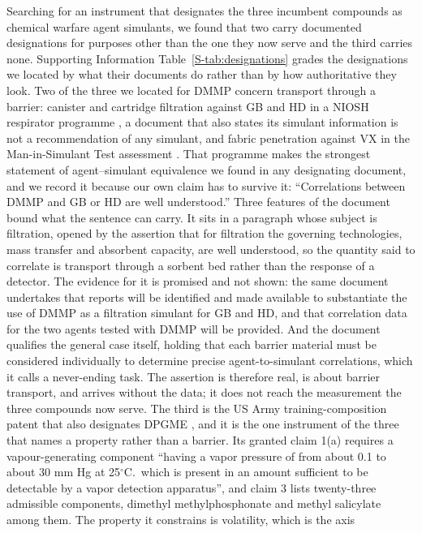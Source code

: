 \documentclass[journal=ancham,manuscript=article,margin=1in]{achemso}
\begin{document}
Searching for an instrument that designates the three incumbent compounds as
chemical warfare agent simulants, we found that two carry documented
designations for purposes other than the one they now serve and the third
carries none. Supporting Information Table~\ref{S-tab:designations} grades the
designations we located by what their documents do rather than by how
authoritative they look. Two of the three
we located for DMMP concern transport through a barrier: canister and cartridge
filtration against GB and HD in a NIOSH respirator programme
\cite{niosh2002simulant}, a document that also states its simulant information
is not a recommendation of any simulant, and fabric penetration against VX in
the Man-in-Simulant Test assessment \cite{nrc1997mist}. That programme makes
the strongest statement of agent--simulant equivalence we found in any
designating document, and we record it because our own claim has to survive it:
``Correlations between DMMP and GB or HD are well understood.'' Three features
of the document bound what the sentence can carry. It sits in a paragraph whose
subject is filtration, opened by the assertion that for filtration the governing
technologies, mass transfer and absorbent capacity, are well understood, so the
quantity said to correlate is transport through a sorbent bed rather than the
response of a detector. The evidence for it is promised and not shown: the same
document undertakes that reports will be identified and made available to
substantiate the use of DMMP as a filtration simulant for GB and HD, and that
correlation data for the two agents tested with DMMP will be provided. And the
document qualifies the general case itself, holding that each barrier material
must be considered individually to determine precise agent-to-simulant
correlations, which it calls a never-ending task. The assertion is therefore
real, is about barrier transport, and arrives without the data; it does not
reach the measurement the three compounds now serve. The third is the US
Army training-composition patent that also designates DPGME
\cite{seitzinger2006simulant}, and it is the one instrument of the three that
names a property rather than a barrier. Its granted claim 1(a) requires a
vapour-generating component ``having a vapor pressure of from about 0.1 to
about 30 mm Hg at 25$^{\circ}$C.\ which is present in an amount sufficient to
be detectable by a vapor detection apparatus'', and claim 3 lists twenty-three
admissible components, dimethyl methylphosphonate and methyl salicylate among
them. The property it constrains is volatility, which is the axis
\end{document}
